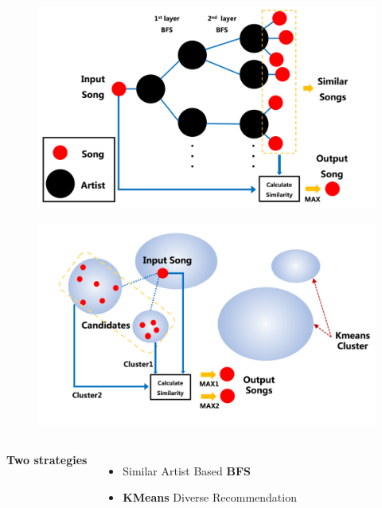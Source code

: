 \documentclass[hyperref={pdfpagelabels=false}]{beamer}
\begin{document}
\begin{frame}
\begin{textblock}{48}
\begin{basebox}[frogbox,title=Big Data Recommendation, opacitybacktitle=.45,colframe=grey!65!black,colbacktitle=green!10, halign title=left]
    
        \begin{minipage}{0.5\linewidth}
            \begin{figure}
                \centering
                \includegraphics[width=\textwidth]{figures/bfs.png}
            \end{figure}
        \end{minipage}
        \begin{minipage}{0.5\linewidth}
            \begin{figure}
                \centering
                \includegraphics[width=\textwidth]{figures/Kmean.png}
            \end{figure}
        \end{minipage}

\bigskip

\begin{columns}
    \textbf{Two strategies}
    \begin{itemize}
    \item Similar Artist Based \textbf{BFS}  
    \item \textbf{KMeans} Diverse Recommendation
    \end{itemize}
    \medskip




\end{columns}
\end{basebox}
\end{textblock}
\end{frame}
\end{document}

